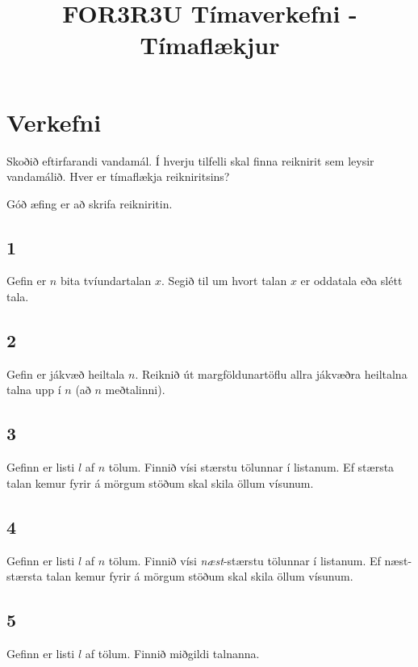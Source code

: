 \documentclass{article}
\title{FOR3R3U Tímaverkefni - Tímaflækjur}
\begin{document}
\maketitle

\section{Verkefni}
Skoðið eftirfarandi vandamál. Í hverju tilfelli skal finna reiknirit sem leysir vandamálið. Hver er tímaflækja reikniritsins?

Góð æfing er að skrifa reikniritin.
\subsection{1}
Gefin er $n$ bita tvíundartalan $x$. Segið til um hvort talan $x$ er oddatala eða slétt tala.

\subsection{2}
Gefin er jákvæð heiltala $n$. Reiknið út margföldunartöflu allra jákvæðra heiltalna talna upp í $n$ (að $n$ meðtalinni).

\subsection{3}
Gefinn er listi $l$ af $n$ tölum. Finnið vísi stærstu tölunnar í listanum. Ef stærsta talan kemur fyrir á mörgum stöðum skal skila öllum vísunum.

\subsection{4}
Gefinn er listi $l$ af $n$ tölum. Finnið vísi \emph{næst}-stærstu tölunnar í listanum. Ef næst-stærsta talan kemur fyrir á mörgum stöðum skal skila öllum vísunum.

\subsection{5}
Gefinn er listi $l$ af tölum. Finnið miðgildi talnanna.
\end{document}
